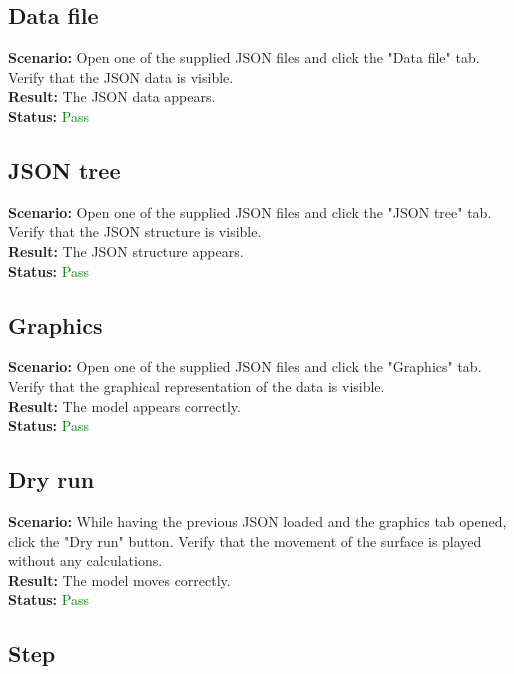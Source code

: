 \documentclass[a4paper, 11pt, article]{report}
\begin{document}
\subsection{Data file}

\noindent \textbf{Scenario:} Open one of the supplied JSON files and click the "Data file" tab. Verify that the JSON data is visible.
\\
\noindent \textbf{Result:} The JSON data appears.
\\
\noindent \textbf{Status:} \textcolor{green}{Pass}

\subsection{JSON tree}

\noindent \textbf{Scenario:} Open one of the supplied JSON files and click the "JSON tree" tab. Verify that the JSON structure is visible.
\\
\noindent \textbf{Result:} The JSON structure appears.
\\
\noindent \textbf{Status:} \textcolor{green}{Pass}

\subsection{Graphics}

\noindent \textbf{Scenario:} Open one of the supplied JSON files and click the "Graphics" tab. Verify that the graphical representation of the data is visible.
\\
\noindent \textbf{Result:} The model appears correctly.
\\
\noindent \textbf{Status:} \textcolor{green}{Pass}

\subsection{Dry run}

\noindent \textbf{Scenario:} While having the previous JSON loaded and the graphics tab opened, click the "Dry run" button. Verify that the movement of the surface is played without any calculations.
\\
\noindent \textbf{Result:} The model moves correctly.
\\
\noindent \textbf{Status:} \textcolor{green}{Pass}

\subsection{Step}
\end{document}
